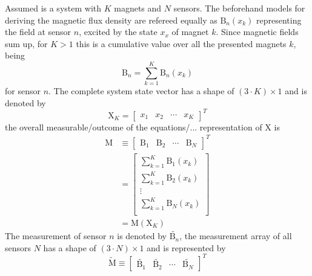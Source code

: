 Assumed is a system with $ K $ magnets and $ N $ sensors. The beforehand models for deriving the magnetic flux density are refereed equally as $ \mathrm{B}_{n}(x_{k}) $ representing the field at sensor $ n $, excited by the state $ x_{x} $ of magnet $ k $. Since magnetic fields sum up, for $ K > 1 $ this is a cumulative value over all the presented magnets $ k $, being
\begin{equation}
\mathrm{B}_{n} = \sum_{k=1}^{K} \mathrm{B}_n(x_{k})
\end{equation}
for sensor $ n $. The complete system state vector has a shape of $ (3 \cdot K) \times 1 $ and is denoted by
\begin{equation}
\mathrm{X}_K = \begin{bmatrix} x_{1} & x_{2} & \cdots & x_{K}  \end{bmatrix}^{T}
\end{equation} 
the overall measurable/outcome of the equations/...  representation of $ \mathrm{X} $ is
\begin{equation}
\begin{aligned}
\mathrm{M} &\equiv \begin{bmatrix} {\mathrm{B}}_{1} & {\mathrm{B}}_{2} & \cdots & {\mathrm{B}}_{N} \end{bmatrix}^{T}\\
		&= \begin{bmatrix}
			\sum_{k=1}^{K} \mathrm{B}_1(x_{k})\\
			\sum_{k=1}^{K} \mathrm{B}_2(x_{k})\\
			\vdots \\
		    \sum_{k=1}^{K} \mathrm{B}_N(x_{k})\\
		\end{bmatrix} \\
	    &= \mathrm{M}(\mathrm{X}_K)
\end{aligned}
\end{equation}
The measurement of sensor $ n $ is denoted by $ \tilde{\mathrm{B}_{n}} $, the measurement array of all sensors $ N $ has a shape of $ (3 \cdot N) \times 1 $ and is represented by 
\begin{equation}
\tilde{\mathrm{M}} \equiv \begin{bmatrix} \tilde{\mathrm{B}_{1}} & \tilde{\mathrm{B}_{2}} & \cdots & \tilde{\mathrm{B}_{N}} \end{bmatrix}^{T}
\end{equation}
